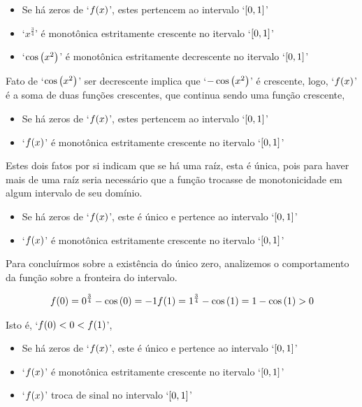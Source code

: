 \documentclass[twoside]{amsart}
\numberwithin{equation}{section}
\begin{document}
\begin{itemize}
    \item Se há zeros de `$f\qty(x)$', estes pertencem ao intervalo `$\qty[0,1]$'
    \item `$x^{\frac34}$' é monotônica estritamente crescente no itervalo `$\qty[0,1]$'
    \item `$\cos\qty(x^2)$' é monotônica estritamente decrescente no itervalo `$\qty[0,1]$'
\end{itemize}

Fato de `$\cos\qty(x^2)$' ser decrescente implica que `$-\cos\qty(x^2)$' é 
crescente, logo, `$f\qty(x)$' é a soma de duas funções crescentes, que 
continua sendo uma função crescente,

\begin{itemize}
    \item Se há zeros de `$f\qty(x)$', estes pertencem ao intervalo `$\qty[0,1]$'
    \item `$f\qty(x)$' é monotônica estritamente crescente no itervalo `$\qty[0,1]$'
\end{itemize}

Estes dois fatos por si indicam que se há uma raíz, esta é única, pois para 
haver mais de uma raíz seria necessário que a função trocasse de 
monotonicidade em algum intervalo de seu domínio. 

\begin{itemize}
    \item Se há zeros de `$f\qty(x)$', este é único e pertence ao intervalo `$\qty[0,1]$'
    \item `$f\qty(x)$' é monotônica estritamente crescente no itervalo `$\qty[0,1]$'
\end{itemize}

Para concluírmos sobre a existência do único zero, analizemos o 
comportamento da função sobre a fronteira do intervalo.

\begin{align}
    f\qty(0) = 0^{\frac34} - \cos\qty(0) = -1\nonumber
    f\qty(1) = 1^{\frac34} - \cos\qty(1) = 1-\cos\qty(1)>0\nonumber
\end{align}

Isto é, `$f\qty(0)<0<f\qty(1)$',

\begin{itemize}
    \item Se há zeros de `$f\qty(x)$', este é único e pertence ao intervalo `$\qty[0,1]$'
    \item `$f\qty(x)$' é monotônica estritamente crescente no itervalo `$\qty[0,1]$'
    \item `$f\qty(x)$' troca de sinal no intervalo `$\qty[0,1]$'
\end{itemize}
\end{document}
